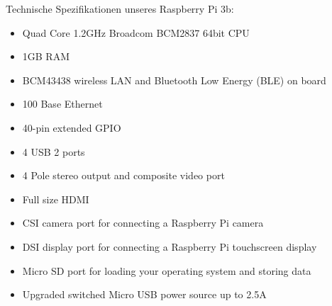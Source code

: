 \documentclass[a4paper,11pt,singlespacing]{article}
\begin{document}
				Technische Spezifikationen unseres Raspberry Pi 3b:
				\begin{itemize}
					\item Quad Core 1.2GHz Broadcom BCM2837 64bit CPU
					\item 1GB RAM
					\item BCM43438 wireless LAN and Bluetooth Low Energy (BLE) on board
					\item 100 Base Ethernet
					\item 40-pin extended GPIO
					\item 4 USB 2 ports
					\item 4 Pole stereo output and composite video port
					\item Full size HDMI
					\item CSI camera port for connecting a Raspberry Pi camera
					\item DSI display port for connecting a Raspberry Pi touchscreen display
					\item Micro SD port for loading your operating system and storing data
					\item Upgraded switched Micro USB power source up to 2.5A
				\end{itemize}
\end{document}
